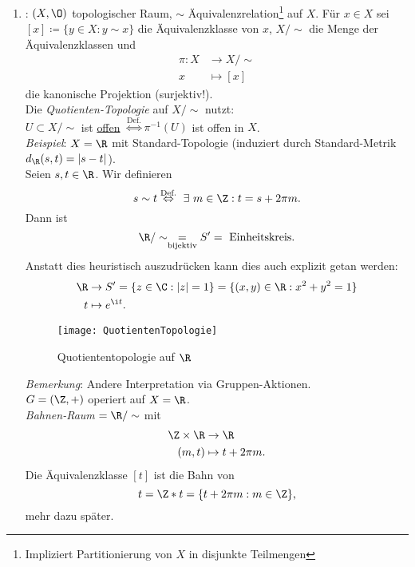 \begin{remark}
\begin{enumerate}
    \item {}: \( (X, \O) \) topologischer Raum, \( \sim \) Äquivalenzrelation\footnote{Impliziert Partitionierung von \( X \) in disjunkte Teilmengen} auf \( X \). Für \( x \in X \) sei \( [x] \coloneqq  \{ y \in X : y \sim x \} \) die Äquivalenzklasse von \( x \), \( X/\sim \) die Menge der Äquivalenzklassen und
    \begin{align*}
      \pi : X &\to X/\sim \\
      x &\mapsto [x]
    \end{align*}
    die kanonische Projektion (surjektiv!). \\
    Die \emph{Quotienten-Topologie} auf \( X/\sim \) nutzt: \\
    \( U \subset X/\sim \) ist \underline{offen} \( \overset{\text{Def.}}{\Leftrightarrow} \pi^{-1}(U) \) ist offen in \( X \). \\
    \emph{Beispiel}: \( X = \R \) mit Standard-Topologie (induziert durch Standard-Metrik \( d_\R(s,t) = \vert s-t \vert \)). \\
    Seien \( s, t \in \R \). Wir definieren
    \begin{equation*}
      s \sim t \overset{\text{Def.}}{\Leftrightarrow} \ \exists \ m \in \Z : t = s + 2\pi m\text{.}
    \end{equation*}
    Dann ist
    \begin{equation*}
      \R/\sim \underset{\text{bijektiv}}{=} S' = \text{ Einheitskreis}\text{.}
    \end{equation*}
    Anstatt dies heuristisch auszudrücken kann dies auch explizit getan werden:
    \begin{align*}
      \R &\to S' = \{ z \in \C : \vert z \vert = 1 \} = \{ (x, y) \in \R : x^2+y^2 = 1 \} \\
      t &\mapsto e^{\i t}\text{.}
    \end{align*}
    \begin{figure}[H]
      \texttt{[image: QuotientenTopologie]}
      \caption{Quotiententopologie auf \( \R \)}
    \end{figure}
    \emph{Bemerkung}: Andere Interpretation via Gruppen-Aktionen. \\
    \( G = (\Z, +) \) operiert auf \( X = \R \). \\
    \emph{Bahnen-Raum} \( = \R/\sim \) mit
    \begin{align*}
      \Z \times \R &\to \R \\
      (m, t) &\mapsto t + 2\pi m\text{.}
    \end{align*}
    Die Äquivalenzklasse \( [t] \) ist die Bahn von
    \begin{equation*}
      t = \Z*t = \{ t+2\pi m : m \in \Z \}\text{,}
    \end{equation*}
    mehr dazu später.
  \end{enumerate}
\end{remark}


